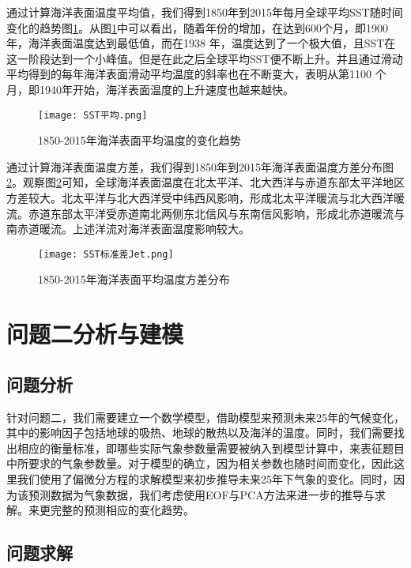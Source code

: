 \documentclass[bwprint]{gmcmthesis}
\begin{document}
通过计算海洋表面温度平均值，我们得到1850年到2015年每月全球平均SST随时间变化的趋势图\ref{sst_ave}。从图\ref{sst_ave}中可以看出，随着年份的增加，在达到600个月，即1900年，海洋表面温度达到最低值，而在1938 年，温度达到了一个极大值，且SST在这一阶段达到一个小峰值。但是在此之后全球平均SST便不断上升。并且通过滑动平均得到的每年海洋表面滑动平均温度的斜率也在不断变大，表明从第1100 个月，即1940年开始，海洋表面温度的上升速度也越来越快。

\begin{figure}[ht]
\centering
\texttt{[image: SST平均.png]}
\caption{1850-2015年海洋表面平均温度的变化趋势}\label{sst_ave}
\end{figure}

通过计算海洋表面温度方差，我们得到1850年到2015年海洋表面温度方差分布图\ref{sst_std}。观察图\ref{sst_std}可知，全球海洋表面温度在北太平洋、北大西洋与赤道东部太平洋地区方差较大。北太平洋与北大西洋受中纬西风影响，形成北太平洋暖流与北大西洋暖流。赤道东部太平洋受赤道南北两侧东北信风与东南信风影响，形成北赤道暖流与南赤道暖流。上述洋流对海洋表面温度影响较大。

\begin{figure}[ht]
\centering
\texttt{[image: SST标准差Jet.png]}
\caption{1850-2015年海洋表面平均温度方差分布}\label{sst_std}
\end{figure}

\section{问题二分析与建模}

\subsection{问题分析}

针对问题二，我们需要建立一个数学模型，借助模型来预测未来25年的气候变化，其中的影响因子包括地球的吸热、地球的散热以及海洋的温度。同时，我们需要找出相应的衡量标准，即哪些实际气象参数量需要被纳入到模型计算中，来表征题目中所要求的气象参数量。对于模型的确立，因为相关参数也随时间而变化，因此这里我们使用了偏微分方程的求解模型来初步推导未来25年下气象的变化。同时，因为该预测数据为气象数据\cite{Dunstone2010Impact}，我们考虑使用EOF与PCA方法来进一步的推导与求解。来更完整的预测相应的变化趋势。

\subsection{问题求解}
\end{document}
